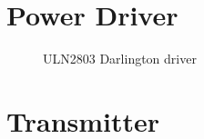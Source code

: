 \section{Power Driver}\label{Appendix: powerDriver}

\begin{figure}[H]
\centering
\begin{subfigmatrix}{2} 
\hspace*{\fill}%
\hfill
{}
\hspace*{\fill}%
\end{subfigmatrix}
\caption{ULN2803 Darlington driver}
\end{figure}


\section{Transmitter}

